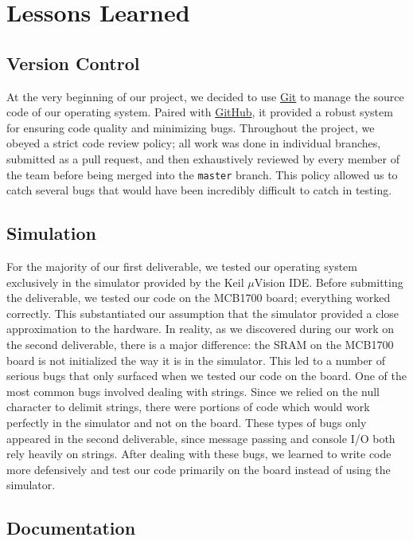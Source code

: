\documentclass[12pt]{report}
\begin{document}
\chapter{Lessons Learned}

\section{Version Control}

At the very beginning of our project, we decided to use \href{http://git-scm.com/}{Git} to manage the source code of our operating system. Paired with \href{http://github.com/}{GitHub}, it provided a robust system for ensuring code quality and minimizing bugs. Throughout the project, we obeyed a strict code review policy; all work was done in individual branches, submitted as a pull request, and then exhaustively reviewed by every member of the team before being merged into the \texttt{master} branch. This policy allowed us to catch several bugs that would have been incredibly difficult to catch in testing.

\section{Simulation}
\label{sec:simulation}

For the majority of our first deliverable, we tested our operating system exclusively in the simulator provided by the Keil $\mu$Vision IDE. Before submitting the deliverable, we tested our code on the MCB1700 board; everything worked correctly. This substantiated our assumption that the simulator provided a close approximation to the hardware. In reality, as we discovered during our work on the second deliverable, there is a major difference: the SRAM on the MCB1700 board is not initialized the way it is in the simulator. This led to a number of serious bugs that only surfaced when we tested our code on the board. One of the most common bugs involved dealing with strings. Since we relied on the null character to delimit strings, there were portions of code which would work perfectly in the simulator and not on the board. These types of bugs only appeared in the second deliverable, since message passing and console I/O both rely heavily on strings. After dealing with these bugs, we learned to write code more defensively and test our code primarily on the board instead of using the simulator.

\section{Documentation}
\end{document}
